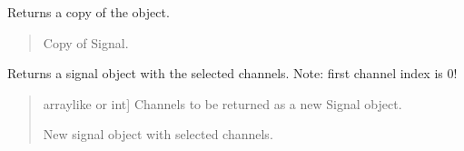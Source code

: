 \documentclass[letterpaper,10pt,english]{sphinxmanual}
\begin{document}
\begin{fulllineitems}
\begin{fulllineitems}
\end{fulllineitems}


\begin{fulllineitems}
\label{\detokenize{classes:dsptoolbox.classes.signal_class.Signal.copy}}
\pysigstartsignatures
{}
\pysigstopsignatures
\sphinxAtStartPar
Returns a copy of the object.
\begin{quote}\begin{description}
\begin{description}
\sphinxlineitem{\sphinxstylestrong{new\_sig}}{[}\sphinxtitleref{Signal}{]}
\sphinxAtStartPar
Copy of Signal.

\end{description}

\end{description}\end{quote}

\end{fulllineitems}


\begin{fulllineitems}
\label{\detokenize{classes:dsptoolbox.classes.signal_class.Signal.get_channels}}
\pysigstartsignatures
{}
\pysigstopsignatures
\sphinxAtStartPar
Returns a signal object with the selected channels.
Note: first channel index is 0!
\begin{quote}\begin{description}
\begin{description}
\sphinxlineitem{\sphinxstylestrong{channels}}{[}array\sphinxhyphen{}like or int{]}
\sphinxAtStartPar
Channels to be returned as a new Signal object.

\end{description}

\begin{description}
\sphinxlineitem{\sphinxstylestrong{new\_sig}}{[}\sphinxtitleref{Signal}{]}
\sphinxAtStartPar
New signal object with selected channels.


\end{description}
\end{description}
\end{quote}
\end{fulllineitems}
\end{fulllineitems}
\end{document}
